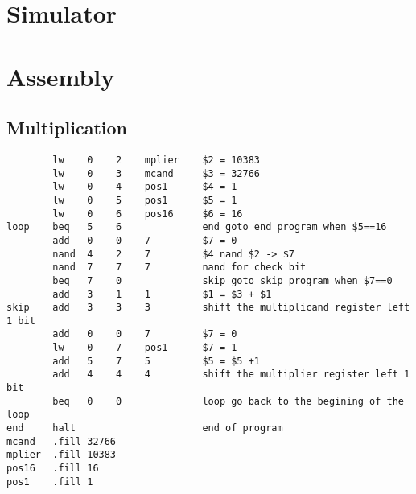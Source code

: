 \documentclass[14pt]{article}
\begin{document}
\newpage
\section{Simulator}
  

\newpage
\section{Assembly}
\subsection{Multiplication}
\begin{lstlisting}
        lw    0    2    mplier    $2 = 10383
        lw    0    3    mcand     $3 = 32766
        lw    0    4    pos1      $4 = 1
        lw    0    5    pos1      $5 = 1
        lw    0    6    pos16     $6 = 16
loop    beq   5    6              end goto end program when $5==16
        add   0    0    7         $7 = 0
        nand  4    2    7         $4 nand $2 -> $7
        nand  7    7    7         nand for check bit
        beq   7    0              skip goto skip program when $7==0
        add   3    1    1         $1 = $3 + $1
skip    add   3    3    3         shift the multiplicand register left 1 bit
        add   0    0    7         $7 = 0
        lw    0    7    pos1      $7 = 1
        add   5    7    5         $5 = $5 +1
        add   4    4    4         shift the multiplier register left 1 bit
        beq   0    0              loop go back to the begining of the loop
end     halt                      end of program
mcand   .fill 32766
mplier  .fill 10383
pos16   .fill 16
pos1    .fill 1
\end{lstlisting}
\end{document}
